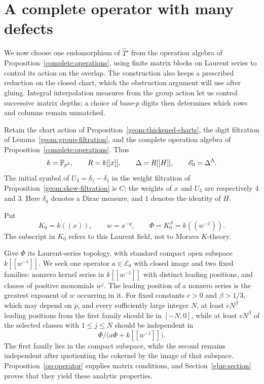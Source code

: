 \section{A complete operator with many defects}
\label{op:section}

We now choose one endomorphism of $\widehat T'$ from the operation
algebra of Proposition~\ref{complete:operations}, using finite matrix
blocks on Laurent series to control its action on the overlap. The
construction also keeps a prescribed reduction on the closed chart,
which the obstruction argument will use after gluing. Integral
interpolation measures from the group action let us control successive
matrix depths; a choice of base-$p$ digits then determines which rows
and columns remain unmatched.

Retain the chart action of Proposition~\ref{geom:thickened-charts}, the digit
filtration of Lemma~\ref{geom:group-filtration}, and the complete operation
algebra of Proposition~\ref{complete:operations}. Thus
\[
 k=\mathbb F_{p^2},\qquad R=k[[x]],\qquad
 \Delta=R[[H]],\qquad \mathscr E_0=\Delta^\Lambda.
\]
The initial symbol of $U_3=\delta_\gamma-\delta_1$ in the weight filtration
of Proposition~\ref{geom:skew-filtration} is $C$; the weights of $x$ and $U_3$
are respectively $4$ and $3$. Here $\delta_g$ denotes a Dirac measure,
and $1$ denotes the identity of $H$.

Put
\[
 K_0=k((x)),\qquad w=x^{-q},\qquad
 \Phi=K_0^\Lambda=k((w^{-1})).
\]
The subscript in $K_0$ refers to this Laurent field, not to Morava
$K$-theory.

Give $\Phi$ its Laurent-series topology, with standard compact open
subspace $k[[w^{-1}]]$. We seek one operator $a\in\mathscr E_0$ with
closed image and two fixed families: nonzero kernel series in
$k[[w^{-1}]]$ with distinct leading positions, and classes of positive
monomials $w^j$. The leading position of a nonzero series is the
greatest exponent of $w$ occurring in it. For fixed constants $c>0$
and $\beta>1/3$, which may depend on $p$, and every sufficiently large
integer $N$, at least $cN^\beta$ leading positions from the first
family should lie in $[-N,0]$, while at least $cN^\beta$ of the
selected classes with $1\le j\le N$ should be independent in
\[
 \Phi\big/\bigl(a\Phi+k[[w^{-1}]]\bigr).
\]
The first family lies in the compact subspace, while the second remains
independent after quotienting the cokernel by the image of that
subspace. Proposition~\ref{op:operator} supplies matrix conditions,
and Section~\ref{glue:section} proves that they yield these analytic
properties.

